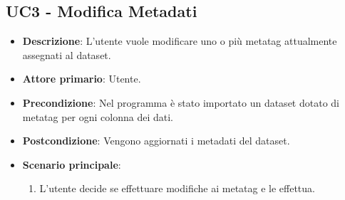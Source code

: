 \newpage
\subsection{UC3 - Modifica Metadati}
\label{sub:uc2}


\begin{itemize}
    \item \textbf{Descrizione}: L’utente vuole modificare uno o più metatag attualmente assegnati al dataset.
	
    \item \textbf{Attore primario}: Utente.
    
    \item \textbf{Precondizione}:   Nel programma è stato importato un dataset dotato di metatag per ogni
                                    colonna dei dati.

    \item \textbf{Postcondizione}:  Vengono aggiornati i metadati del dataset.

	\item \textbf{Scenario principale}:
		\begin{enumerate}
			\item L'utente decide se effettuare modifiche ai metatag e le effettua.
        \end{enumerate}

\end{itemize}
